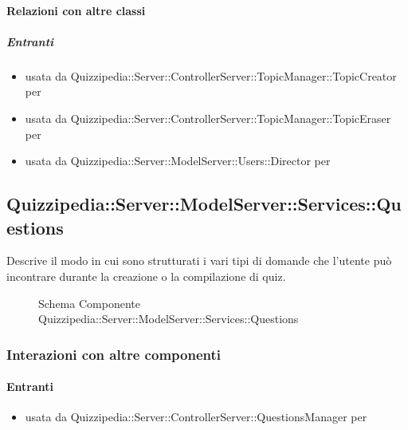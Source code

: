 \paragraph{Relazioni con altre classi}
\subparagraph{Entranti}
\begin{itemize}
\item usata da Quizzipedia::Server::ControllerServer::TopicManager::TopicCreator per 
\item usata da Quizzipedia::Server::ControllerServer::TopicManager::TopicEraser per 
\item usata da Quizzipedia::Server::ModelServer::Users::Director per 
\end{itemize}
\subsection{Quizzipedia::Server::ModelServer::Services::Questions}
Descrive il modo in cui sono strutturati i vari tipi di domande che l'utente può incontrare durante la creazione o la compilazione di quiz.
\begin{figure}[H]
\centering
\noindent{}
\caption[Schema Componente Quizzipedia::Server::ModelServer::Services::Questions]{Schema Componente Quizzipedia::Server::ModelServer::Services::Questions}
\end{figure}
\subsubsection{Interazioni con altre componenti}
\paragraph{Entranti}
\begin{itemize}
\item usata da Quizzipedia::Server::ControllerServer::QuestionsManager per 
\end{itemize}
